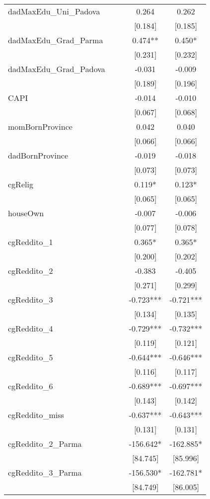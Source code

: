 \documentclass[]{article}
\begin{document}
\begin{tabular}{lcccc}
dadMaxEdu\_Uni\_Padova &  &  & 0.264 & 0.262 \\
 &  &  & [0.184] & [0.185] \\
dadMaxEdu\_Grad\_Parma &  &  & 0.474** & 0.450* \\
 &  &  & [0.231] & [0.232] \\
dadMaxEdu\_Grad\_Padova &  &  & -0.031 & -0.009 \\
 &  &  & [0.189] & [0.196] \\
CAPI &  &  & -0.014 & -0.010 \\
 &  &  & [0.067] & [0.068] \\
momBornProvince &  &  & 0.042 & 0.040 \\
 &  &  & [0.066] & [0.066] \\
dadBornProvince &  &  & -0.019 & -0.018 \\
 &  &  & [0.073] & [0.073] \\
cgRelig &  &  & 0.119* & 0.123* \\
 &  &  & [0.065] & [0.065] \\
houseOwn &  &  & -0.007 & -0.006 \\
 &  &  & [0.077] & [0.078] \\
cgReddito\_1 &  &  & 0.365* & 0.365* \\
 &  &  & [0.200] & [0.202] \\
cgReddito\_2 &  &  & -0.383 & -0.405 \\
 &  &  & [0.271] & [0.299] \\
cgReddito\_3 &  &  & -0.723*** & -0.721*** \\
 &  &  & [0.134] & [0.135] \\
cgReddito\_4 &  &  & -0.729*** & -0.732*** \\
 &  &  & [0.119] & [0.121] \\
cgReddito\_5 &  &  & -0.644*** & -0.646*** \\
 &  &  & [0.116] & [0.117] \\
cgReddito\_6 &  &  & -0.689*** & -0.697*** \\
 &  &  & [0.143] & [0.142] \\
cgReddito\_miss &  &  & -0.637*** & -0.643*** \\
 &  &  & [0.131] & [0.131] \\
cgReddito\_2\_Parma &  &  & -156.642* & -162.885* \\
 &  &  & [84.745] & [85.996] \\
cgReddito\_3\_Parma &  &  & -156.530* & -162.781* \\
 &  &  & [84.749] & [86.005] \\

\end{tabular}
\end{document}
